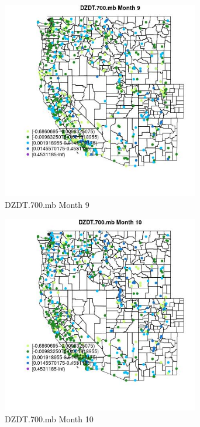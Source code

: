 \begin{figure} 
\centering  
\includegraphics[width=0.77\textwidth]{Code_Outputs/Report_ML_input_PM25_Step4_part_e_de_duplicated_aves_compiled_2019-05-14wNAs_MapObsMo9DZDT700mb.jpg} 
\caption{\label{fig:Report_ML_input_PM25_Step4_part_e_de_duplicated_aves_compiled_2019-05-14wNAsMapObsMo9DZDT700mb}DZDT.700.mb Month 9} 
\end{figure} 
 

\begin{figure} 
\centering  
\includegraphics[width=0.77\textwidth]{Code_Outputs/Report_ML_input_PM25_Step4_part_e_de_duplicated_aves_compiled_2019-05-14wNAs_MapObsMo10DZDT700mb.jpg} 
\caption{\label{fig:Report_ML_input_PM25_Step4_part_e_de_duplicated_aves_compiled_2019-05-14wNAsMapObsMo10DZDT700mb}DZDT.700.mb Month 10} 
\end{figure} 
 

